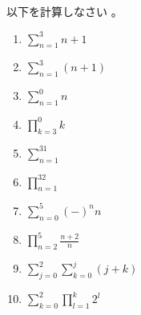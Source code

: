 \documentclass[twocolumn,11pt]{jarticle}
\begin{document}
\nquestion
以下を計算しなさい
。
\begin{enumerate}
\item\label{item:sum_n=(1-3)n+1} $\displaystyle\sum_{n=1}^3n+1$
\item\label{item:sum_n=(1-3)(n+1)} $\displaystyle\sum_{n=1}^3(n+1)$
\item\label{item:nosum} $\displaystyle\sum_{n=1}^0n$
\item\label{item:noprod}$\displaystyle\prod_{k=3}^0k$
\item\label{item:sum_n=(1-3)1} $\displaystyle\sum_{n=1}^31$
\item\label{item:prod_n=(1-3)2} $\displaystyle\prod_{n=1}^32$
\item\label{item:sum(-)^n} $\displaystyle\sum_{n=0}^5 (-)^n n$
\item\label{item:prod_n=(2-5)(n+2)/n} $\displaystyle\prod_{n=2}^{5} \frac{n+2}{n}$
 \item\label{item:sum_j=(0-2)sum_k=(0-j)(j+k)} $\displaystyle\sum_{j=0}^2\sum_{k=0}^j(j+k)$
\item\label{item:sum_k=(0-2)prod_l=(1-k)2^l}$\displaystyle\sum_{k=0}^{2} \prod_{l=1}^{k}2^l$
\end{enumerate}
\end{document}
